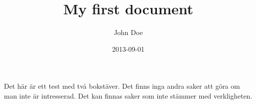 \documentclass{article}
\title{My first document}
\date{2013-09-01}
\author{John Doe}
\begin{document}
  \maketitle

  Det här är ett test med två bokstäver. Det finns inga andra saker att göra om man inte är intresserad.
  Det kan finnas saker som inte stämmer med verkligheten.
\end{document}
